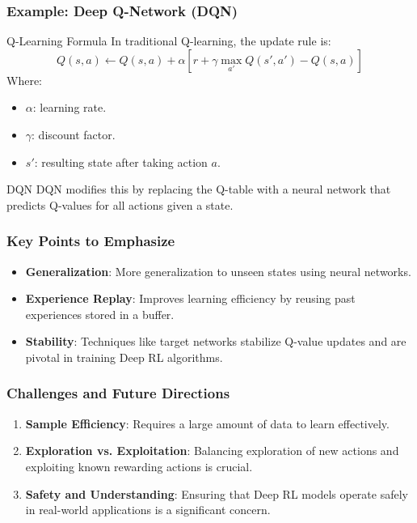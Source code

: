 \documentclass[aspectratio=169]{beamer}
\begin{document}
\begin{frame}[fragile]
    \frametitle{Example: Deep Q-Network (DQN)}
    \begin{block}{Q-Learning Formula}
        In traditional Q-learning, the update rule is:
        \begin{equation}
        Q(s, a) \leftarrow Q(s, a) + \alpha \left[ r + \gamma \max_{a'} Q(s', a') - Q(s, a) \right]
        \end{equation}
        Where:
        \begin{itemize}
            \item $\alpha$: learning rate.
            \item $\gamma$: discount factor.
            \item $s'$: resulting state after taking action $a$.
        \end{itemize}
    \end{block}
    \begin{block}{DQN}
        DQN modifies this by replacing the Q-table with a neural network that predicts Q-values for all actions given a state.
    \end{block}
\end{frame}

\begin{frame}[fragile]
    \frametitle{Key Points to Emphasize}
    \begin{itemize}
        \item \textbf{Generalization}: More generalization to unseen states using neural networks.
        \item \textbf{Experience Replay}: Improves learning efficiency by reusing past experiences stored in a buffer.
        \item \textbf{Stability}: Techniques like target networks stabilize Q-value updates and are pivotal in training Deep RL algorithms.
    \end{itemize}
\end{frame}

\begin{frame}[fragile]
    \frametitle{Challenges and Future Directions}
    \begin{enumerate}
        \item \textbf{Sample Efficiency}: Requires a large amount of data to learn effectively.
        \item \textbf{Exploration vs. Exploitation}: Balancing exploration of new actions and exploiting known rewarding actions is crucial.
        \item \textbf{Safety and Understanding}: Ensuring that Deep RL models operate safely in real-world applications is a significant concern.
    \end{enumerate}
\end{frame}
\end{document}
